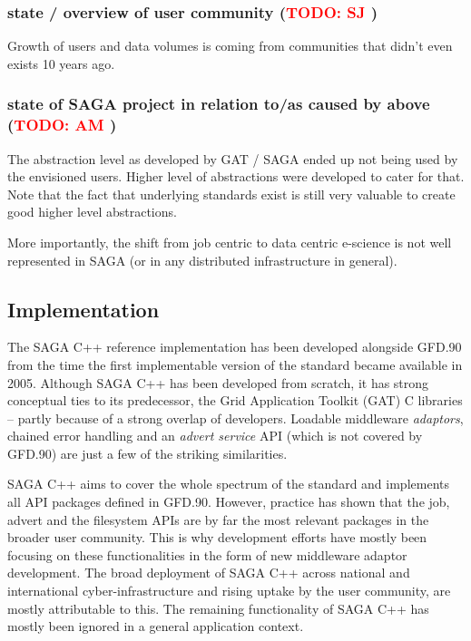 \documentclass{article}
\newcommand{\B}[1]{\textbf{#1}}
\newcommand{\todo}[1]{{\textcolor{red}{\B{TODO:} #1 }}}
\begin{document}
 \subsubsection{ state / overview of user community (\todo{SJ})}
 Growth of users and data volumes is coming from communities that
 didn't even exists 10 years ago.
 
 
 \subsubsection{ state of SAGA project in relation to/as caused by above (\todo{AM})}
 
 The abstraction level as developed by GAT / SAGA ended up not being
 used by the envisioned users.  Higher level of abstractions were
 developed to cater for that. Note that the fact that underlying
 standards exist is still very valuable to create good higher level
 abstractions.

 More importantly, the shift from job centric to data centric
 e-science is not well represented in SAGA (or in any distributed
 infrastructure in general).

\subsection{Implementation}

The SAGA C++ reference implementation has been developed alongside
GFD.90 from the time the first implementable version of the standard
became available in 2005. Although SAGA C++ has been developed from
scratch, it has strong conceptual ties to its predecessor, the Grid
Application Toolkit (GAT) C libraries -- partly because of a strong
overlap of developers.  Loadable middleware \textit{adaptors}, chained
error handling and an \textit{advert service} API (which is not
covered by GFD.90) are just a few of the striking similarities.

SAGA C++ aims to cover the whole spectrum of the standard and
implements all API packages defined in GFD.90. However, practice has
shown that the job, advert and the filesystem APIs are by far the most
relevant packages in the broader user community.  This is why
development efforts have mostly been focusing on these functionalities
in the form of new middleware adaptor development. The broad
deployment of SAGA C++ across national and international
cyber-infrastructure and rising uptake by the user community, are
mostly attributable to this. The remaining functionality of SAGA C++
has mostly been ignored in a general application context.
\end{document}
